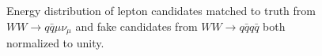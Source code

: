 \begin{figure}
\begin{minipage}{0.48\textwidth}
\caption{Energy distribution of lepton candidates matched to truth from $WW \rightarrow q \bar{q} \mu \nu_\mu $ and fake candidates from $ WW \rightarrow q\bar{q} q \bar{q}$ both normalized to unity.\\}
\label{fig:candE}
\end{minipage}
\end{figure}



